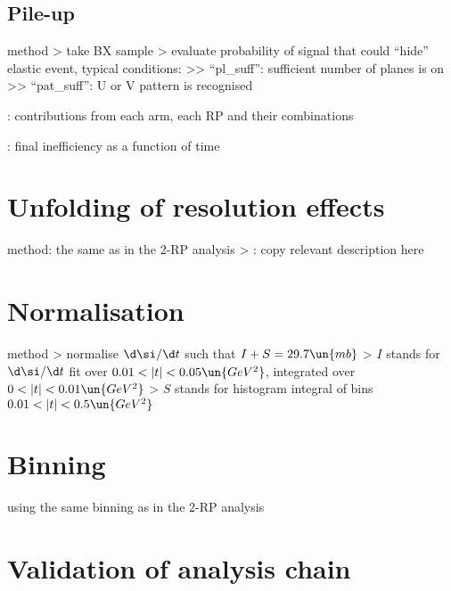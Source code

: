 \subsection{Pile-up}

\> method
\>> take BX sample
\>> evaluate probability of signal that could ``hide'' elastic event, typical conditions:
\>>> ``pl\_suff'': sufficient number of planes is on
\>>> ``pat\_suff'': U or V pattern is recognised 

\> : contributions from each arm, each RP and their combinations

\> : final inefficiency as a function of time



\section{Unfolding of resolution effects}

\> method: the same as in the 2-RP analysis
\>> \TODO: copy relevant description here



\section{Normalisation}

\> method
\>> normalise $\d\si/\d t$ such that $I + S = 29.7\un{mb}$
\>> $I$ stands for $\d\si/\d t$ fit over $0.01 < |t| < 0.05\un{GeV^2}$, integrated over $0 < |t| < 0.01\un{GeV^2}$
\>> $S$ stands for histogram integral of bins $0.01 < |t| < 0.5\un{GeV^2}$


\section{Binning}

\> using the same binning as in the 2-RP analysis



\section{Validation of analysis chain}

